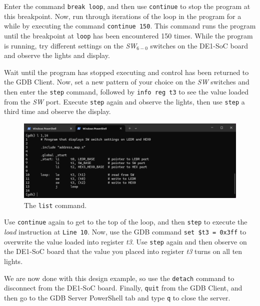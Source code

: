\documentclass[11pt, twoside, pdftex]{article}
\newcommand{\red}[1]{{\color{red}\sf{#1}}}
\begin{document}
Enter the command \texttt{break loop}, and 
then use \texttt{continue} to stop the program at this breakpoint.
Now, run through iterations of the loop in the program for a while by executing the 
command \texttt{continue 150}. This command runs the
program until the breakpoint at \texttt{loop} has been encountered 150 times. While the 
program is running, try different settings on the {\it SW}$_{6-0}$ switches on the DE1-SoC 
board and observe the \red{{\it LEDR}} lights and \red{{\it HEX0}} display. 

Wait until the program has stopped executing and control has been returned to the GDB
Client. Now, set a new pattern of your choice on the {\it SW} switches and then enter
the \texttt{step} command, followed by \texttt{info reg t3} to see the value loaded from 
the {\it SW} port. Execute \texttt{step} again and observe the \red{{\it LEDR}} lights, 
then use \texttt{step} a third time and observe the \red{{\it HEX0}} display. 

\begin{figure}[h]
    \begin{center}
        \includegraphics[scale=.6]{figures/display_s2.png}
        \caption{The \texttt{list} command.}
        \label{fig:display_s2}
    \end{center}
\end{figure}

Use \texttt{continue} again to get to the top of the loop, and then \texttt{step} to
execute the {\it load} instruction at \texttt{Line 10}. Now, use the GDB command 
\texttt{set \$t3 = 0x3ff} to overwrite the value loaded into register {\it t3}. Use
\texttt{step} again and then observe on the DE1-SoC board that the value you placed 
into register {\it t3} turns on all ten \red{{\it LEDR}} lights. 

We are now done with this design example, so use the \texttt{detach} command to disconnect
from the DE1-SoC board. Finally, \texttt{quit} from the GDB Client, and then go to the
GDB Server PowerShell tab and type \texttt{q} to close the server.
\end{document}
